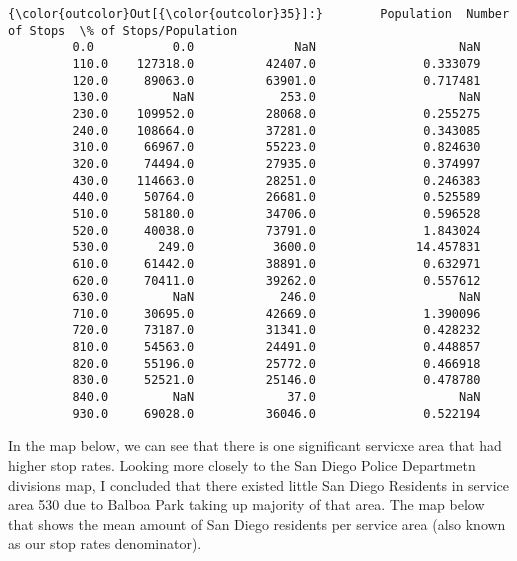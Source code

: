 \documentclass[11pt]{article}
\begin{document}
\begin{Verbatim}[commandchars=\\\{\}]
{\color{outcolor}Out[{\color{outcolor}35}]:}        Population  Number of Stops  \% of Stops/Population
         0.0           0.0              NaN                    NaN
         110.0    127318.0          42407.0               0.333079
         120.0     89063.0          63901.0               0.717481
         130.0         NaN            253.0                    NaN
         230.0    109952.0          28068.0               0.255275
         240.0    108664.0          37281.0               0.343085
         310.0     66967.0          55223.0               0.824630
         320.0     74494.0          27935.0               0.374997
         430.0    114663.0          28251.0               0.246383
         440.0     50764.0          26681.0               0.525589
         510.0     58180.0          34706.0               0.596528
         520.0     40038.0          73791.0               1.843024
         530.0       249.0           3600.0              14.457831
         610.0     61442.0          38891.0               0.632971
         620.0     70411.0          39262.0               0.557612
         630.0         NaN            246.0                    NaN
         710.0     30695.0          42669.0               1.390096
         720.0     73187.0          31341.0               0.428232
         810.0     54563.0          24491.0               0.448857
         820.0     55196.0          25772.0               0.466918
         830.0     52521.0          25146.0               0.478780
         840.0         NaN             37.0                    NaN
         930.0     69028.0          36046.0               0.522194
\end{Verbatim}
            
    In the map below, we can see that there is one significant servicxe area
that had higher stop rates. Looking more closely to the San Diego Police
Departmetn divisions map, I concluded that there existed little San
Diego Residents in service area 530 due to Balboa Park taking up
majority of that area. The map below that shows the mean amount of San
Diego residents per service area (also known as our stop rates
denominator).
\end{document}
